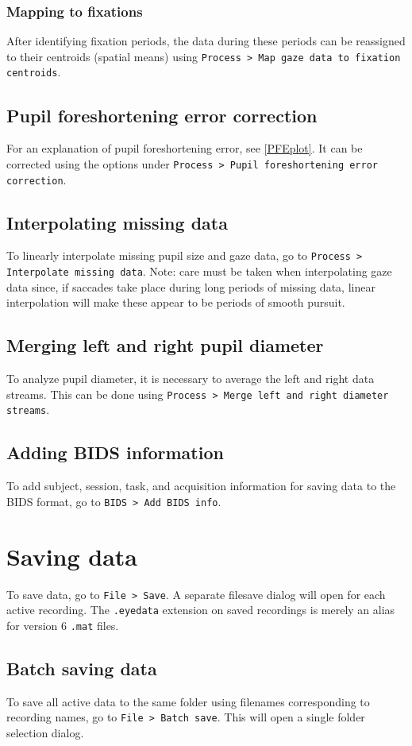 \documentclass{article}
\begin{document}
\subsubsection{Mapping to fixations}
After identifying fixation periods, the data during these periods can be reassigned to their centroids (spatial means) using \texttt{Process > Map gaze data to fixation centroids}.
\subsection{Pupil foreshortening error correction} \label{PFEcorrection}
For an explanation of pupil foreshortening error, see \ref{PFEplot}. It can be corrected using the options under \texttt{Process > Pupil foreshortening error correction}.
\subsection{Interpolating missing data}
To linearly interpolate missing pupil size and gaze data, go to \texttt{Process > Interpolate missing data}. Note: care must be taken when interpolating gaze data since, if saccades take place during long periods of missing data, linear interpolation will make these appear to be periods of smooth pursuit.
\subsection{Merging left and right pupil diameter}
To analyze pupil diameter, it is necessary to average the left and right data streams. This can be done using \texttt{Process > Merge left and right diameter streams}.
\subsection{Adding BIDS information}
To add subject, session, task, and acquisition information for saving data to the BIDS format, go to \texttt{BIDS > Add BIDS info}.

\section{Saving data}
To save data, go to \texttt{File > Save}. A separate filesave dialog will open for each active recording. The \texttt{.eyedata} extension on saved recordings is merely an alias for version 6 \texttt{.mat} files.
\subsection{Batch saving data}
To save all active data to the same folder using filenames corresponding to recording names, go to \texttt{File > Batch save}. This will open a single folder selection dialog.
\end{document}
